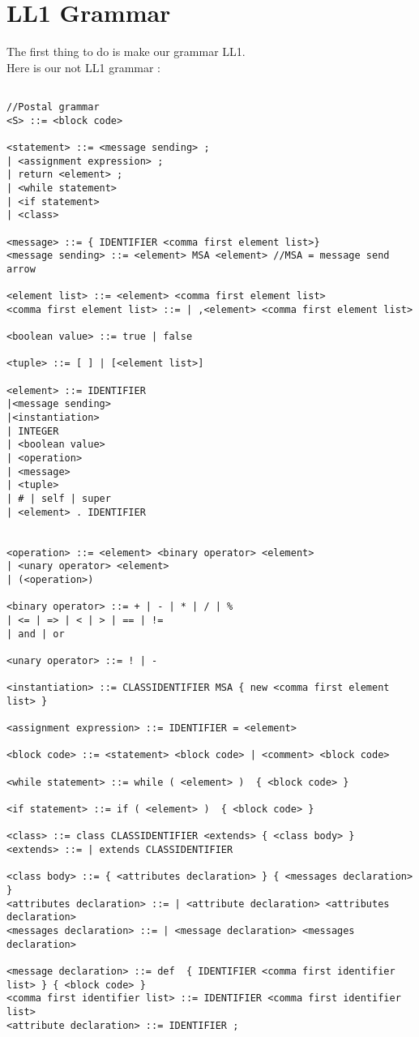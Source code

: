 \documentclass{eplDoc}
\begin{document}
\maketitle
\newpage

\section{LL1 Grammar}
The first thing to do is make our grammar LL1. \\
Here is our not LL1 grammar : 
\begin{lstlisting}
    
//Postal grammar
<S> ::= <block code>

<statement> ::= <message sending> ;
| <assignment expression> ;
| return <element> ;
| <while statement>
| <if statement>
| <class>

<message> ::= { IDENTIFIER <comma first element list>}
<message sending> ::= <element> MSA <element> //MSA = message send arrow

<element list> ::= <element> <comma first element list>
<comma first element list> ::= | ,<element> <comma first element list>

<boolean value> ::= true | false

<tuple> ::= [ ] | [<element list>]
    
<element> ::= IDENTIFIER
|<message sending>
|<instantiation>
| INTEGER
| <boolean value>
| <operation>
| <message>
| <tuple>
| # | self | super
| <element> . IDENTIFIER


<operation> ::= <element> <binary operator> <element>
| <unary operator> <element>
| (<operation>)

<binary operator> ::= + | - | * | / | % 
| <= | => | < | > | == | != 
| and | or

<unary operator> ::= ! | - 

<instantiation> ::= CLASSIDENTIFIER MSA { new <comma first element list> }

<assignment expression> ::= IDENTIFIER = <element>

<block code> ::= <statement> <block code> | <comment> <block code>

<while statement> ::= while ( <element> )  { <block code> }

<if statement> ::= if ( <element> )  { <block code> }

<class> ::= class CLASSIDENTIFIER <extends> { <class body> }
<extends> ::= | extends CLASSIDENTIFIER

<class body> ::= { <attributes declaration> } { <messages declaration> }
<attributes declaration> ::= | <attribute declaration> <attributes declaration>
<messages declaration> ::= | <message declaration> <messages declaration>

<message declaration> ::= def  { IDENTIFIER <comma first identifier list> } { <block code> }
<comma first identifier list> ::= IDENTIFIER <comma first identifier list>
<attribute declaration> ::= IDENTIFIER ;
\end{lstlisting}
\end{document}
